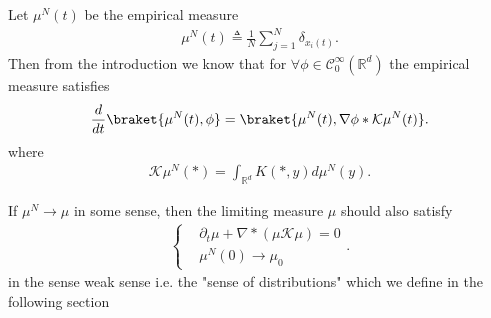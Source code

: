 \begin{definition}
  Let $\mu ^{N}(t) $ be the empirical measure 
  \begin{align*}
    \mu ^{N }(t) \triangleq \frac{1}{N}  \sum_{j=1}^{N} \delta_{x_i(t)} 
  .\end{align*}
Then from the introduction we know that for $\forall \phi  \in \mathcal{C}_0^{\infty}(\mathbb{R}^{d} ) $  the empirical measure satisfies
\begin{align*}
  \frac{d}{dt} \braket{\mu^N(t),\phi } = \braket{\mu^N(t),\nabla \phi *\mathcal{K}\mu ^{N}(t) }
.\end{align*}
where 
\begin{align*}
  \mathcal{K}\mu ^{N}(*) = \int_{\mathbb{R}^{d} }  K(*,y) d\mu ^{N}(y) 
.\end{align*}
\end{definition}
\begin{idea}
 If $\mu ^{N} \to \mu  $  in some sense, then the limiting measure $\mu $ should also satisfy 
 \begin{align*}
  \begin{cases}
    &\partial_t \mu  + \nabla * (\mu \mathcal{K} \mu ) = 0 \\
    & \mu^N(0)   \to \mu_0
  \end{cases}
 .\end{align*}
 in the sense weak sense i.e. the "sense of distributions" which we define in the following section
\end{idea}
